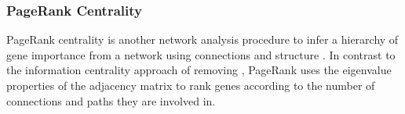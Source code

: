 \begin{table*}[!htb]
\caption{\acrshort{ANOVA} for synthetic lethality and information centrality}
\label{tab:SL_Pathway_GPCR_InfoCent}
\noindent{}
\end{table*} \filbreak

\FloatBarrier

\subsubsection{PageRank Centrality}  \label{chapt4:Network_PageRank}

\FloatBarrier

\gls{PageRank centrality} is another network analysis procedure to infer a hierarchy of gene importance from a network using connections and structure \citep{Brin1998}. In contrast to the \gls{information centrality} approach of removing , PageRank uses the eigenvalue properties of the adjacency matrix to rank genes according to the number of connections and paths they are involved in. 


